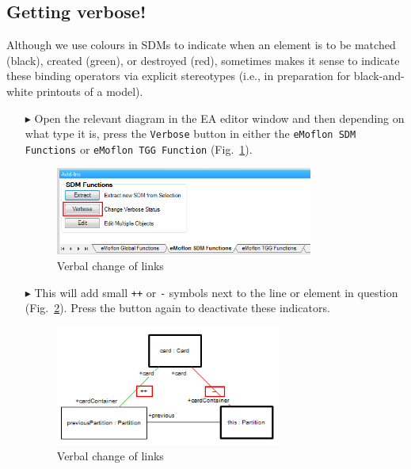 \subsection{Getting verbose!}

Although we use colours in SDMs to indicate when an element is to be matched (black), created (green), or destroyed (red), sometimes makes it sense to indicate
these binding operators via explicit stereotypes (i.e., in preparation for black-and-white printouts of a model).

\begin{enumerate}
  
\item[$\blacktriangleright$] Open the relevant diagram in the EA editor window and then depending on what type it is, press the \texttt{Verbose} button in
either the \texttt{eMoflon SDM Functions} or \texttt{eMoflon TGG Function} (Fig.~\ref{ea:changeVStatus}).

\vspace{0.5cm}

\begin{figure}[htbp]
\begin{center}
  \includegraphics[width=0.8\textwidth]{ea_changeVerboseStatus}
  \caption{Verbal change of links}  
  \label{ea:changeVStatus}
\end{center}
\end{figure}

\item[$\blacktriangleright$] This will add small \texttt{++} or \texttt{-} symbols next to the line or element in question (Fig.~\ref{ea:verboseSymbols}). Press
the button again to deactivate these indicators.

\begin{figure}[htbp]
\begin{center}
  \includegraphics[width=0.7\textwidth]{ea_verboseSymbols}
  \caption{Verbal change of links}  
  \label{ea:verboseSymbols}
\end{center}
\end{figure}

\end{enumerate}
